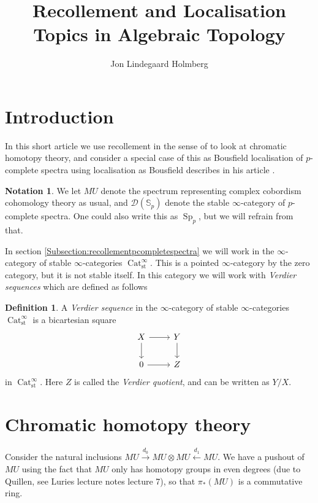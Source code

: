 \documentclass[a4paper]{article} %
\author{Jon Lindegaard Holmberg}
\title{Recollement and Localisation\\Topics in Algebraic Topology}
\theoremstyle{definition}
\newtheorem{definition}[theorem]{Definition}
\newtheorem{notation}{Notation}
\newcommand{\Sph}{\mathbb{S}}
\DeclareMathOperator{\Cat}{Cat}         %
\begin{document}
\maketitle

\tableofcontents

\section{Introduction}

In this short article we use recollement in the sense of  to look at chromatic homotopy theory, and consider a special case of this as Bousfield localisation of $p$-complete spectra using localisation as Bousfield describes in his article .
\begin{notation}
  We let $MU$ denote the spectrum representing complex cobordism cohomology theory as usual, and $\mathcal{D} (\Sph_p)$ denote the stable $\infty$-category of $p$-complete spectra. One could also write this as $\operatorname{Sp}_p$, but we will refrain from that.
\end{notation}
In section \ref{Subsection:recollementpcompletespectra} we will work in the $\infty$-category of stable $\infty$-categories $\Cat_{\text{st}}^\infty$. This is a pointed $\infty$-category by the zero category, but it is not stable itself. In this category we will work with \textit{Verdier sequences} which are defined as follows

\begin{definition}
  A \textit{Verdier sequence} in the $\infty$-category of stable $\infty$-categories $\Cat_{\text{st}}^\infty$ is a bicartesian square
  \[
    \begin{tikzcd}
      X \arrow{r}{} \arrow{d}{} & Y \arrow{d}{} \\
       0 \arrow{r}{} & Z
    \end{tikzcd}
  \]
  in $\Cat_{\text{st}}^\infty$. Here $Z$ is called the \textit{Verdier quotient}, and can be written as $Y/X$.
\end{definition}

\section{Chromatic homotopy theory}

Consider the natural inclusions $MU \overset{d_0}{\to} MU \otimes MU \overset{d_1}{\leftarrow} MU$. We have a pushout of $MU$ using the fact that $MU$ only has homotopy groups in even degrees (due to Quillen, see Luries lecture notes lecture 7), so that $\pi_*(MU)$ is a commutative ring.
\end{document}
